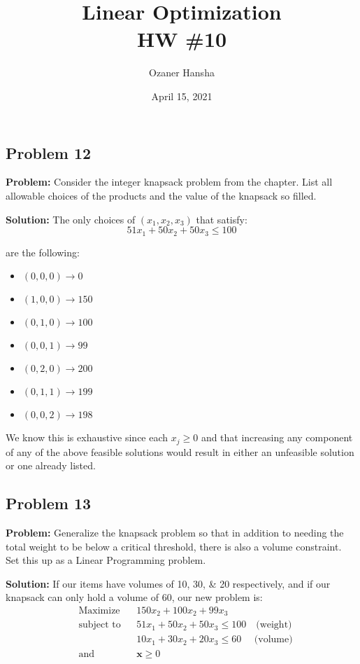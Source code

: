 \documentclass{article}
\renewcommand\vec{\mathbf}
\begin{document}
\title{Linear Optimization\\HW \#10}
\author{Ozaner Hansha}
\date{April 15, 2021}
\maketitle

\subsection*{Problem 12}
\noindent\textbf{Problem:} Consider the integer knapsack problem from the chapter. List all allowable choices of the products and the value of the knapsack so filled.
\bigskip

\noindent\textbf{Solution:} The only choices of $(x_1,x_2,x_3)$ that satisfy:
$$51x_1+50x_2+50x_3\le 100$$

are the following:
\begin{itemize}
    \item $(0,0,0)\to 0$
    \item $(1,0,0)\to 150$
    \item $(0,1,0)\to 100$
    \item $(0,0,1)\to 99$
    \item $(0,2,0)\to 200$
    \item $(0,1,1)\to 199$
    \item $(0,0,2)\to 198$
\end{itemize}
We know this is exhaustive since each $x_j\ge 0$ and that increasing any component of any of the above feasible solutions would result in either an unfeasible solution or one already listed.

\subsection*{Problem 13}
\noindent\textbf{Problem:} Generalize the knapsack problem so that in addition to needing the total weight to be below a critical threshold, there is also a volume constraint. Set this up as a Linear Programming problem.
\bigskip

\noindent\textbf{Solution:} If our items have volumes of 10, 30, \& 20 respectively, and if our knapsack can only hold a volume of 60, our new problem is:
$$\begin{aligned}
    &{\text{Maximize}}
    &&150x_2+100x_2+99x_3\\
    &{\text{subject to}}
    &&51x_1+50x_2+50x_3\le 100\quad\text{(weight)}\\
    &
    &&10x_1+30x_2+20x_3\le 60\quad\text{ (volume)}\\
    &{\text{and}}
    &&\vec x\ge 0
\end{aligned}$$
\end{document}
